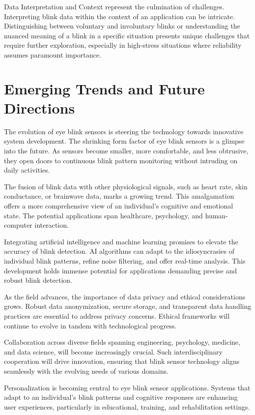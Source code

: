 \documentclass[conference]{IEEEtran}
\begin{document}
Data Interpretation and Context represent the culmination of challenges. Interpreting blink data within the context of an application can be intricate. Distinguishing between voluntary and involuntary blinks or understanding the nuanced meaning of a blink in a specific situation presents unique challenges that require further exploration, especially in high-stress situations where reliability assumes paramount importance.

\section{Emerging Trends and Future Directions}

The evolution of eye blink sensors is steering the technology towards innovative system development. The shrinking form factor of eye blink sensors is a glimpse into the future. As sensors become smaller, more comfortable, and less obtrusive, they open doors to continuous blink pattern monitoring without intruding on daily activities. 

The fusion of blink data with other physiological signals, such as heart rate, skin conductance, or brainwave data, marks a growing trend. This amalgamation offers a more comprehensive view of an individual's cognitive and emotional state. The potential applications span healthcare, psychology, and human-computer interaction.

Integrating artificial intelligence and machine learning promises to elevate the accuracy of blink detection. AI algorithms can adapt to the idiosyncrasies of individual blink patterns, refine noise filtering, and offer real-time analysis. This development holds immense potential for applications demanding precise and robust blink detection.

As the field advances, the importance of data privacy and ethical considerations grows. Robust data anonymization, secure storage, and transparent data handling practices are essential to address privacy concerns. Ethical frameworks will continue to evolve in tandem with technological progress.

Collaboration across diverse fields spanning engineering, psychology, medicine, and data science, will become increasingly crucial. Such interdisciplinary cooperation will drive innovation, ensuring that blink sensor technology aligns seamlessly with the evolving needs of various domains.

Personalization is becoming central to eye blink sensor applications. Systems that adapt to an individual's blink patterns and cognitive responses are enhancing user experiences, particularly in educational, training, and rehabilitation settings.
\end{document}
